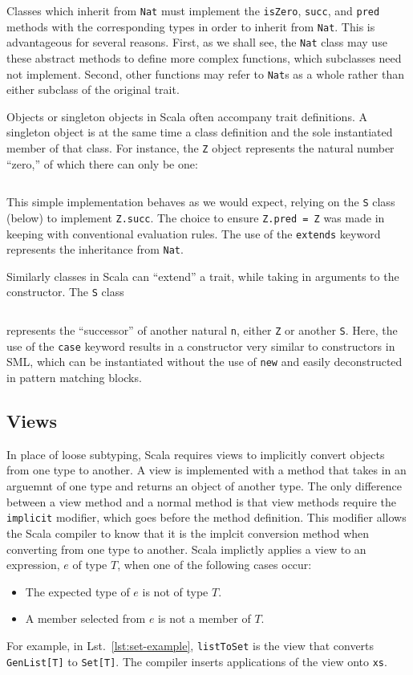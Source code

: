 \documentclass[jou,apacite]{IEEEtran}
\begin{document}
Classes which inherit from \texttt{Nat} must implement the \texttt{isZero},
\texttt{succ}, and \texttt{pred} methods with the corresponding types in order
to inherit from \texttt{Nat}. This is advantageous for several reasons. First,
as we shall see, the \texttt{Nat} class may use these abstract methods to define
more complex functions, which subclasses need not implement. Second, other
functions may refer to \texttt{Nat}s as a whole rather than either subclass of
the original trait.

Objects or singleton objects in Scala often accompany trait definitions. A
singleton object is at the same time a class definition and the sole
instantiated member of that class. For instance, the \texttt{Z} object
represents the natural number ``zero,'' of which there can only be one: %
\begin{samepage}
  \inputminted{Scala}{../examples/ExampleZero.scala} %
\end{samepage}
This simple implementation behaves as we would expect, relying on the \texttt{S}
class (below) to implement \texttt{Z.succ}. The choice to ensure \texttt{Z.pred
  = Z} was made in keeping with conventional evaluation rules. The use of the
\texttt{extends} keyword represents the inheritance from \texttt{Nat}.

Similarly classes in Scala can ``extend'' a trait, while taking in arguments to
the constructor. The \texttt{S} class %
\begin{samepage}
  \inputminted{Scala}{../examples/ExampleSucc.scala} %
\end{samepage}
represents the ``successor'' of another natural \texttt{n}, either \texttt{Z} or
another \texttt{S}. Here, the use of the \texttt{case} keyword results in a
constructor very similar to constructors in SML, which can be instantiated
without the use of \texttt{new} and easily deconstructed in pattern matching
blocks.

\subsection{Views}
\label{sec:views}

In place of loose subtyping, Scala requires views to implicitly convert objects
from one type to another. A view is implemented with a method that takes in an
arguemnt of one type and returns an object of another type. The only difference
between a view method and a normal method is that view methods require the
\texttt{implicit} modifier, which goes before the method definition. This
modifier allows the Scala compiler to know that it is the implcit conversion
method when converting from one type to another. Scala implictly applies a view
to an expression, $e$ of type $T$, when one of the following cases occur:
\begin{itemize}
\item The expected type of $e$ is not of type $T$.
\item A member selected from $e$ is not a member of $T$.
\end{itemize}  
For example, in Lst.~\ref{lst:set-example}, \texttt{listToSet} is the view that
converts \texttt{GenList[T]} to \texttt{Set[T]}. The compiler inserts
applications of the view onto \texttt{xs}.
\end{document}
